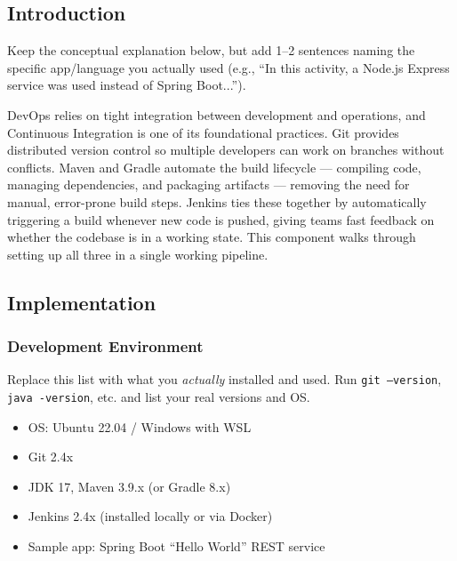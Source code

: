 \documentclass[12pt,a4paper]{article}
\begin{document}
\subsection*{Introduction}
\begin{studentnote}
Keep the conceptual explanation below, but add 1--2 sentences naming the specific app/language you actually used (e.g., ``In this activity, a Node.js Express service was used instead of Spring Boot...'').
\end{studentnote}

DevOps relies on tight integration between development and operations, and Continuous Integration is one of its foundational practices. Git provides distributed version control so multiple developers can work on branches without conflicts. Maven and Gradle automate the build lifecycle --- compiling code, managing dependencies, and packaging artifacts --- removing the need for manual, error-prone build steps. Jenkins ties these together by automatically triggering a build whenever new code is pushed, giving teams fast feedback on whether the codebase is in a working state. This component walks through setting up all three in a single working pipeline.

\subsection*{Implementation}

\subsubsection*{Development Environment}
\begin{studentnote}
Replace this list with what you \textit{actually} installed and used. Run \texttt{git --version}, \texttt{java -version}, etc. and list your real versions and OS.
\end{studentnote}
\begin{itemize}[nosep]
    \item OS: Ubuntu 22.04 / Windows with WSL
    \item Git 2.4x
    \item JDK 17, Maven 3.9.x (or Gradle 8.x)
    \item Jenkins 2.4x (installed locally or via Docker)
    \item Sample app: Spring Boot ``Hello World'' REST service
\end{itemize}
\end{document}
